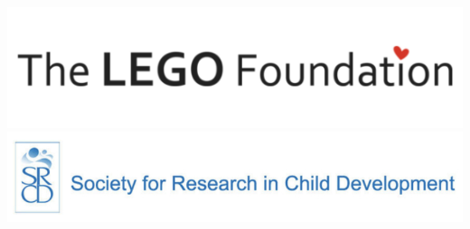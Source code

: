 \documentclass[landscape,final,paperwidth=75in,paperheight=48in,fontscale=0.285]{baposter}
\begin{document}
\begin{poster}
{\begin{center}
    \hspace{4em}
    \includegraphics[scale=0.5,valign=t]{img/lego.png}
    \includegraphics[scale=0.5,valign=t]{img/srcd.png}
\end{center}   

} 

\end{poster}%
%
\end{document}
